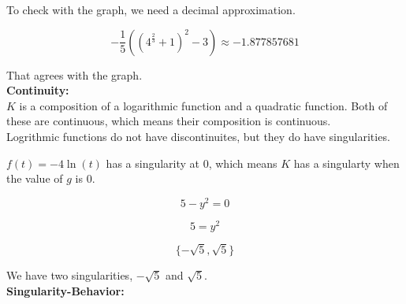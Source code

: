\documentclass{ximera}
\begin{document}
To check with the graph, we need a decimal approximation.






\[
-\frac{1}{5} \left( \left( 4^{\tfrac{2}{3}} + 1 \right)^2 - 3 \right) \approx -1.877857681
\]


That agrees with the graph.\\



































\textbf{\textcolor{blue!55!black}{Continuity:}} \\


$K$ is a composition of a logarithmic function and a quadratic function.  Both of these are continuous, which means their composition is continuous. \\

Logrithmic functions do not have discontinuites, but they do have singularities.  


$f(t) = -4\ln(t)$ has a singularity at $0$, which means $K$ has a singularty when the value of $g$ is $0$.



\[
5 - y^2 = 0
\]



\[
5 = y^2
\]



\[
\{ -\sqrt{5}, \sqrt{5} \}
\]

We have two singularities, $-\sqrt{5}$ and $\sqrt{5}$. \\












\textbf{\textcolor{blue!55!black}{Singularity-Behavior:}} \\
\end{document}
